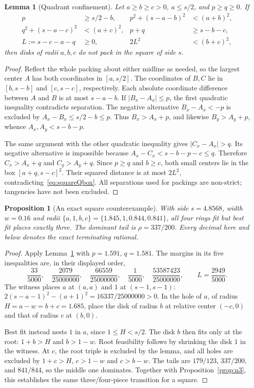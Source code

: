 \documentclass[11pt]{article}
\newtheorem{lemma}[theorem]{Lemma}
\newtheorem{proposition}[theorem]{Proposition}
\theoremstyle{definition}
\begin{document}
\begin{lemma}[Quadrant confinement]\label{lem:squareQ}
Let $a\ge b\ge c>0$, $a\le s/2$, and $p\ge q\ge0$. If
\begin{align}
 p&\ge s/2-b, & p^2+(s-a-b)^2&<(a+b)^2,\label{eq:squareQb}\\
 q^2+(s-a-c)^2&<(a+c)^2, &p+q&\ge s-b-c,\label{eq:squareQc}\\
 L:=s-c-a-q&\ge0, &2L^2&<(b+c)^2,\label{eq:squareQbox}
\end{align}
then disks of radii $a,b,c$ do not pack in the square of side $s$.
\end{lemma}
\begin{proof}
Reflect the whole packing about either midline as needed, so the
largest center $A$ has both coordinates in $[a,s/2]$. The coordinates
of $B,C$ lie in $[b,s-b]$ and $[c,s-c]$, respectively. Each absolute
coordinate difference between $A$ and $B$ is at most $s-a-b$.
If $|B_x-A_x|\le p$, the first quadratic inequality contradicts
separation. The negative alternative $B_x-A_x<-p$ is excluded by
$A_x-B_x\le s/2-b\le p$. Thus $B_x>A_x+p$, and likewise
$B_y>A_y+p$, whence $A_x,A_y<s-b-p$.

The same argument with the other quadratic inequality gives
$|C_x-A_x|>q$. Its negative alternative is impossible because
$A_x-C_x<s-b-p-c\le q$. Therefore $C_x>A_x+q$ and
$C_y>A_y+q$. Since $p\ge q$ and $b\ge c$, both small centers lie
in the box $[a+q,s-c]^2$. Their squared distance is at most $2L^2$,
contradicting~\eqref{eq:squareQbox}. All separations used for
packings are non-strict; tangencies have not been excluded.
\end{proof}

\begin{proposition}[An exact square counterexample]\label{prop:squareD}
With side $s=4.8568$, width $w=0.16$ and radii
$\{a,1,b,c\}=\{1.845,1,0.844,0.841\}$, all four rings fit but
best fit places exactly three. The dominant tail is $\rho=337/200$.
Every decimal here and below denotes the exact terminating rational.
\end{proposition}
\begin{proof}
Apply Lemma~\ref{lem:squareQ} with $p=1.591$, $q=1.581$.
The margins in its five inequalities are, in their displayed order,
\[
 \frac{33}{5000},\quad\frac{2079}{25000000},\quad
 \frac{66559}{25000000},\quad\frac1{5000},\quad
 \frac{53587423}{25000000},\qquad L=\frac{2949}{5000}.
\]
The witness places $a$ at $(a,a)$ and $1$ at $(s-1,s-1)$:
$2(s-a-1)^2-(a+1)^2=16337/25000000>0$. In the hole of $a$,
of radius $H=a-w=b+c=1.685$, place the disk of radius $b$ at
relative center $(-c,0)$ and that of radius $c$ at $(b,0)$.

Best fit instead nests $1$ in $a$, since $1\le H<s/2$.
The disk $b$ then fits only at the root: $1+b>H$ and $b>1-w$.
Root feasibility follows by shrinking the disk $1$ in the witness.
At $c$, the root triple is excluded by the lemma, and all holes are
excluded by $1+c>H$, $c>1-w$ and $c>b-w$. The tails are
$179/123$, $337/200$, and $841/844$, so the middle one dominates.
Together with Proposition~\ref{prop:n3}, this establishes the same
three/four-piece transition for a square.
\end{proof}
\end{document}
